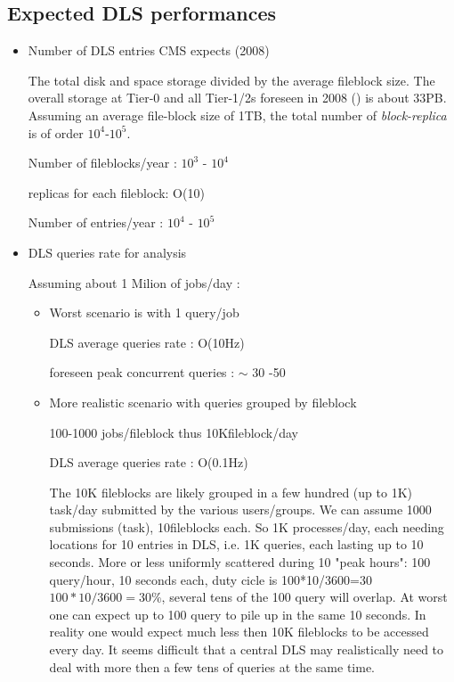 \documentclass[pdftex]{cmspaper}
\begin{document}
\subsection{Expected DLS performances}
\begin{itemize}
\item Number of DLS entries CMS expects (2008)

The total disk and space storage divided by the average fileblock size.
The overall storage at Tier-0 and all Tier-1/2s foreseen in 2008 (\cite{CTDR})
is about 33PB. Assuming an average file-block size of 1TB, the
total number of {\em block-replica} is of order $10^{4}$-$10^{5}$.


Number of fileblocks/year  : $10^{3}$ - $10^{4}$

replicas for each fileblock: O(10)

Number of entries/year : $10^{4}$ - $10^{5}$

\item DLS queries rate for analysis

Assuming about 1 Milion of jobs/day :
 \begin{itemize}
 \item Worst scenario is with 1 query/job 

  DLS average queries rate          :  O(10Hz)

  foreseen peak concurrent queries : $\sim$ 30 -50  

 \item More realistic scenario with queries grouped by fileblock

  100-1000 jobs/fileblock thus 10Kfileblock/day

  DLS average queries rate :  O(0.1Hz)


The 10K fileblocks are likely grouped in a few hundred (up to 1K) task/day submitted by the various users/groups.
We can assume 1000 submissions (task), 10fileblocks each. So 1K processes/day,
each needing locations for 10 entries in DLS, i.e. 1K queries, each
lasting up to 10 seconds. More or less uniformly scattered during
10 "peak hours": 100 query/hour, 10 seconds each, duty cicle is
100*10/3600=30 $100*10/3600=30\%$, several tens of the 100 query will overlap.
At worst one can expect up to 100 query to pile up in the same 10 seconds.
In reality one would expect much less then 10K fileblocks to be accessed every day.
It seems difficult that a central DLS may realistically need to deal with 
more then a few tens of queries at the same time.
                                                                                

\end{itemize}
\end{itemize}
\end{document}
